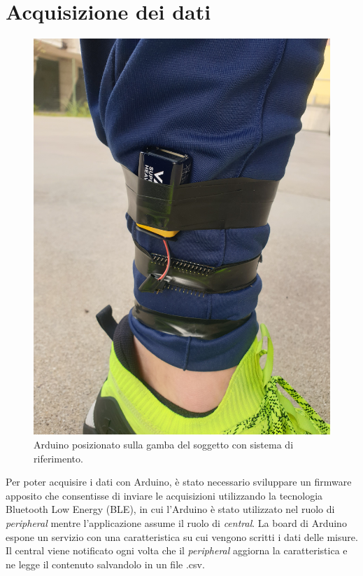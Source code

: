 \section{Acquisizione dei dati}
\begin{figure}[tbh]
	\centering
	\includegraphics[angle=-90, width=0.5\linewidth]{./ImageFiles/arduino_su_gamba.jpg}
	\caption{Arduino posizionato sulla gamba del soggetto con sistema di riferimento.}
	\label{fig:arduino_su_gamba}
\end{figure}
Per poter acquisire i dati con Arduino, è stato necessario sviluppare un firmware apposito che consentisse di inviare le acquisizioni utilizzando la tecnologia Bluetooth Low Energy (BLE), in cui l'Arduino è stato utilizzato nel ruolo di \textit{peripheral} mentre l'applicazione assume il ruolo di \textit{central}. La board di Arduino espone un servizio con una caratteristica su cui vengono scritti i dati delle misure. Il central viene notificato ogni volta che il \textit{peripheral} aggiorna la caratteristica e ne legge il contenuto salvandolo in un file .csv.

